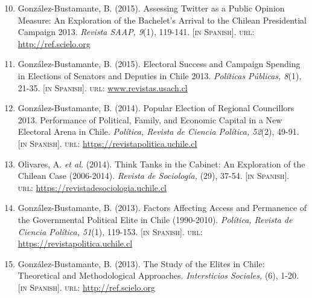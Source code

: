 \documentclass[letterpaper,margin]{res}
\newenvironment{benumerate}[1]{
    \let\oldItem\item
    \def\item{\addtocounter{enumi}{-2}\oldItem}
    \begin{enumerate}
    \setcounter{enumi}{#1}
    \addtocounter{enumi}{1}
}{
    \end{enumerate}
}
\begin{document}
\begin{resume}
\begin{benumerate}{9}
\item{\small Gonz\'alez-Bustamante, B. (2015). Assessing Twitter as a Public Opinion Measure: An Exploration of the Bachelet's Arrival to the Chilean Presidential Campaign 2013. {\itshape Revista SAAP, 9}(1), 119-141. {\footnotesize \scshape [in Spanish]}. {\scshape url}: \href{http://ref.scielo.org/dwzhns}{http://ref.scielo.org}}\vspace{1mm}

\item{\small Gonz\'alez-Bustamante, B. (2015). Electoral Success and Campaign Spending in Elections of Senators and Deputies in Chile 2013. {\itshape Pol\'iticas P\'ublicas, 8}(1), 21-35. {\footnotesize \scshape [in Spanish]}. {\scshape url}: \href{http://www.revistas.usach.cl/ojs/index.php/politicas/article/view/2182}{www.revistas.usach.cl}}\vspace{1mm}

\item{\small Gonz\'alez-Bustamante, B. (2014). Popular Election of Regional Councillors 2013. Performance of Political, Family, and Economic Capital in a New Electoral Arena in Chile. {\itshape Pol\'itica, Revista de Ciencia Pol\'itica, 52}(2), 49-91. {\footnotesize \scshape [in Spanish]}. {\scshape url}: \href{https://revistapolitica.uchile.cl/index.php/RP/article/view/36137}{https://revistapolitica.uchile.cl}}\vspace{1mm}

\item{\small Olivares, A. {\itshape et al.} (2014). Think Tanks in the Cabinet: An Exploration of the Chilean Case (2006-2014). {\itshape Revista de Sociolog\'ia,} (29), 37-54. {\footnotesize \scshape [in Spanish]}. \\ {\scshape url}: \href{https://revistadesociologia.uchile.cl/index.php/RDS/article/view/36177}{https://revistadesociologia.uchile.cl}}\vspace{1mm}

\item{\small Gonz\'alez-Bustamante, B. (2013). Factors Affecting Access and Permanence of the Governmental Political Elite in Chile (1990-2010). {\itshape Pol\'itica, Revista de Ciencia Pol\'itica, 51}(1), 119-153. {\footnotesize \scshape [in Spanish]}. {\scshape url}: \href{https://revistapolitica.uchile.cl/index.php/RP/article/view/27436}{https://revistapolitica.uchile.cl}}\vspace{1mm}

\item{\small Gonz\'alez-Bustamante, B. (2013). The Study of the Elites in Chile: Theoretical and Methodological Approaches. {\itshape Intersticios Sociales,} (6), 1-20. {\footnotesize \scshape [in Spanish]}. {\scshape url}: \href{http://ref.scielo.org/zrnp2k}{http://ref.scielo.org}}\vspace{1mm}


\end{benumerate}
\end{resume}
\end{document}
